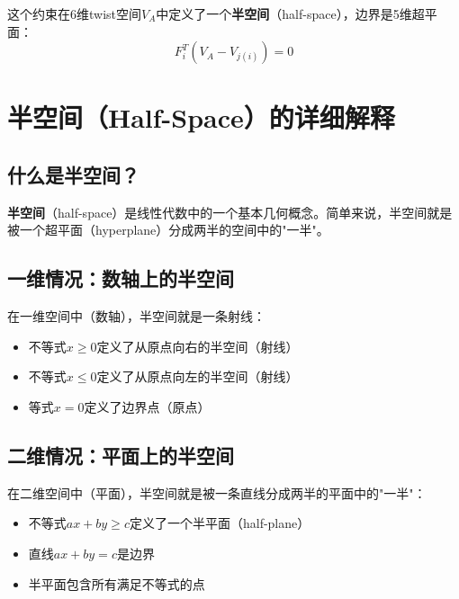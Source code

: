 \documentclass[12pt,a4paper]{article}
\begin{document}
这个约束在6维twist空间$V_A$中定义了一个\textbf{半空间}（half-space），边界是5维超平面：
\begin{equation}
F_i^T (V_A - V_{j(i)}) = 0
\label{eq:constraint_boundary}
\end{equation}

\section{半空间（Half-Space）的详细解释}

\subsection{什么是半空间？}

\textbf{半空间}（half-space）是线性代数中的一个基本几何概念。简单来说，半空间就是被一个超平面（hyperplane）分成两半的空间中的"一半"。

\subsection{一维情况：数轴上的半空间}

在一维空间中（数轴），半空间就是一条射线：

\begin{itemize}
\item 不等式$x \geq 0$定义了从原点向右的半空间（射线）
\item 不等式$x \leq 0$定义了从原点向左的半空间（射线）
\item 等式$x = 0$定义了边界点（原点）
\end{itemize}

\begin{center}
\end{center}

\subsection{二维情况：平面上的半空间}

在二维空间中（平面），半空间就是被一条直线分成两半的平面中的"一半"：

\begin{itemize}
\item 不等式$ax + by \geq c$定义了一个半平面（half-plane）
\item 直线$ax + by = c$是边界
\item 半平面包含所有满足不等式的点
\end{itemize}
\end{document}
